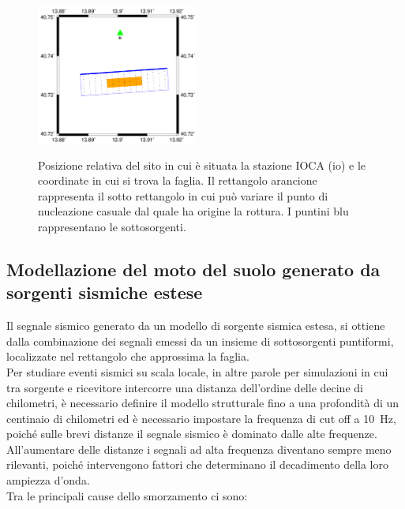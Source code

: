 \documentclass[a4paper,12pt,titlepage]{article}
\begin{document}
\begin{figure}[htbp]%
 \centering
 \includegraphics[width = 150pt, height =150pt]{Img/Positions.png}
 \caption{Posizione relativa del sito in cui è situata la stazione IOCA (io) e le coordinate in cui si trova la faglia. Il rettangolo arancione rappresenta il sotto rettangolo in cui può variare il punto di nucleazione casuale dal quale ha origine la rottura. I puntini blu rappresentano le sottosorgenti.}
 \label{fig:Positions}
\end{figure}
\clearpage

\subsection{Modellazione del moto del suolo generato da sorgenti sismiche estese}
Il segnale sismico generato da un modello di sorgente sismica estesa, si ottiene dalla combinazione dei segnali emessi da un insieme di sottosorgenti puntiformi, localizzate nel rettangolo che approssima la faglia.\\
Per studiare eventi sismici su scala locale, in altre parole per simulazioni in cui tra sorgente e ricevitore intercorre una distanza dell'ordine delle decine di chilometri, è necessario definire il modello strutturale fino a una profondità di un centinaio di chilometri ed è necessario impostare la frequenza di cut off a \SI{10}{\hertz}, poiché sulle brevi distanze il segnale sismico è dominato dalle alte frequenze.\\
All'aumentare delle distanze i segnali ad alta frequenza diventano sempre meno rilevanti, poiché intervengono fattori che determinano il decadimento della loro ampiezza d'onda.\\
Tra le principali cause dello smorzamento ci sono:\\
\end{document}
